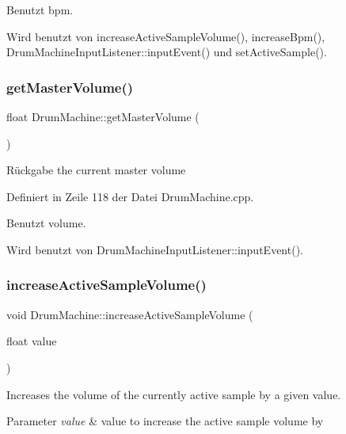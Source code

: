 Benutzt bpm.



Wird benutzt von increase\+Active\+Sample\+Volume(), increase\+Bpm(), Drum\+Machine\+Input\+Listener\+::input\+Event() und set\+Active\+Sample().

\mbox{\label{class_drum_machine_a3590f99d021aad35cca24fdcb0f8a246}} 
\subsubsection{\texorpdfstring{get\+Master\+Volume()}{getMasterVolume()}}
{\footnotesize\ttfamily float Drum\+Machine\+::get\+Master\+Volume (\begin{DoxyParamCaption}{ }\end{DoxyParamCaption})}

\begin{DoxyReturn}{Rückgabe}
the current master volume 
\end{DoxyReturn}


Definiert in Zeile 118 der Datei Drum\+Machine.\+cpp.



Benutzt volume.



Wird benutzt von Drum\+Machine\+Input\+Listener\+::input\+Event().

\mbox{\label{class_drum_machine_a2316557d08fecdaa8936be2562749e95}} 
\subsubsection{\texorpdfstring{increase\+Active\+Sample\+Volume()}{increaseActiveSampleVolume()}}
{\footnotesize\ttfamily void Drum\+Machine\+::increase\+Active\+Sample\+Volume (\begin{DoxyParamCaption}\item[{float}]{value }\end{DoxyParamCaption})}

Increases the volume of the currently active sample by a given value. 
\begin{DoxyParams}{Parameter}
{\em value} & value to increase the active sample volume by \\
\hline
\end{DoxyParams}



